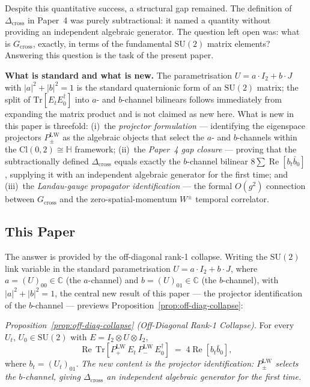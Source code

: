 \documentclass[12pt]{article}
\numberwithin{equation}{section}
\theoremstyle{plain}
\theoremstyle{definition}
\theoremstyle{remark}
\newcommand{\cl}{\mathrm{Cl}}              %
\newcommand{\su}{\mathrm{SU}}              %
\newcommand{\tr}{\mathrm{Tr}}              %
\newcommand{\Cplx}{\mathbb{C}}             %
\newcommand{\HH}{\mathbb{H}}               %
\newcommand{\Gcross}{G_{\mathrm{cross}}}   %
\newcommand{\Dcross}{\Delta_{\mathrm{cross}}}  %
\newcommand{\PLW}{P^{\mathrm{LW}}}         %
\begin{document}
	Despite this quantitative success, a structural gap remained.  The
	definition of $\Dcross$ in Paper~4 was purely subtractional: it named
	a quantity without providing an independent algebraic generator.
	The question left open was: what is $\Gcross$, exactly, in terms of
	the fundamental $\su(2)$ matrix elements?  Answering this question
	is the task of the present paper.

	\medskip\noindent
	\textbf{What is standard and what is new.}
	The parametrisation $U = a\cdot I_2 + b\cdot J$ with $|a|^2+|b|^2=1$
	is the standard quaternionic form of an $\su(2)$ matrix; the split of
	$\tr[E_t E_0^{\dagger}]$ into $a$- and $b$-channel bilinears follows
	immediately from expanding the matrix product and is not claimed as
	new here.  What is new in this paper is threefold:
	(i)~the \emph{projector formulation} --- identifying the eigenspace
	projectors $\PLW_\pm$ as the algebraic objects that select the $a$-
	and $b$-channels within the $\cl(0,2)\cong\HH$ framework;
	(ii)~the \emph{Paper~4 gap closure} --- proving that the
	subtractionally defined $\Dcross$ equals exactly the $b$-channel
	bilinear $8\sum\operatorname{Re}[b_t\bar{b}_0]$, supplying it with
	an independent algebraic generator for the first time;
	and (iii)~the \emph{Landau-gauge propagator identification} --- the
	formal $O(g^2)$ connection between $\Gcross$ and the
	zero-spatial-momentum $W^{\pm}$ temporal correlator.
	
	\subsection{This Paper}
	\label{sec:intro-this-paper}
	
	The answer is provided by the off-diagonal rank-1 collapse.  Writing
	the $\su(2)$ link variable in the standard parametrisation
	$U = a\cdot I_2 + b\cdot J$, where $a = (U)_{00}\in\Cplx$
	(the $a$-channel) and $b = (U)_{01}\in\Cplx$ (the $b$-channel),
	with $|a|^2 + |b|^2 = 1$, the central new result of this paper
	--- the projector identification of the $b$-channel ---
	previews Proposition~\ref{prop:off-diag-collapse}:
	
	\medskip
	\noindent\emph{Proposition~\ref{prop:off-diag-collapse}
		(Off-Diagonal Rank-1 Collapse).}\enspace
	For every $U_t,\,U_0\in\su(2)$ with $E = I_2\otimes U\otimes I_2$,
	\[
	\operatorname{Re}\,\tr\!\left[\PLW_+\, E_t\,\PLW_-\, E_0^{\dagger}\right]
	\;=\; 4\operatorname{Re}[b_t \bar{b}_0],
	\]
	where $b_t = (U_t)_{01}$.  \emph{The new content is the projector
	identification: $\PLW_\pm$ selects the $b$-channel, giving $\Dcross$
	an independent algebraic generator for the first time.}
	
\end{document}
